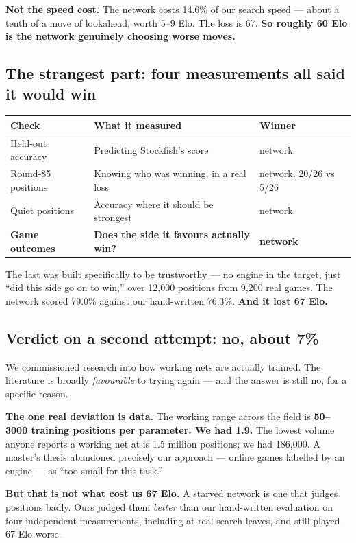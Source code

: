 \documentclass[11pt,a4paper]{article}
\begin{document}
\textbf{Not the speed cost.} The network costs 14.6\% of our search speed --- about a tenth of a
move of lookahead, worth 5--9 Elo. The loss is 67. \textbf{So roughly 60 Elo is the network
genuinely choosing worse moves.}

\subsection{The strangest part: four measurements all said it would win}

\begin{center}
\begin{tabular}{lll}
\toprule
Check & What it measured & Winner \\
\midrule
Held-out accuracy & Predicting Stockfish's score & network \\
Round-85 positions & Knowing who was winning, in a real loss & network, 20/26 vs 5/26 \\
Quiet positions & Accuracy where it should be strongest & network \\
\textbf{Game outcomes} & \textbf{Does the side it favours actually win?} & \textbf{network} \\
\bottomrule
\end{tabular}
\end{center}

The last was built specifically to be trustworthy --- no engine in the target, just ``did this
side go on to win,'' over 12,000 positions from 9,200 real games. The network scored 79.0\%
against our hand-written 76.3\%. \textbf{And it lost 67 Elo.}

\subsection{Verdict on a second attempt: no, about 7\%}

We commissioned research into how working nets are actually trained. The literature is broadly
\emph{favourable} to trying again --- and the answer is still no, for a specific reason.

\textbf{The one real deviation is data.} The working range across the field is \textbf{50--3000
training positions per parameter. We had 1.9.} The lowest volume anyone reports a working net at
is 1.5 million positions; we had 186,000. A master's thesis abandoned precisely our approach ---
online games labelled by an engine --- as ``too small for this task.''

\textbf{But that is not what cost us 67 Elo.} A starved network is one that judges positions
badly. Ours judged them \emph{better} than our hand-written evaluation on four independent
measurements, including at real search leaves, and still played 67 Elo worse.
\end{document}
